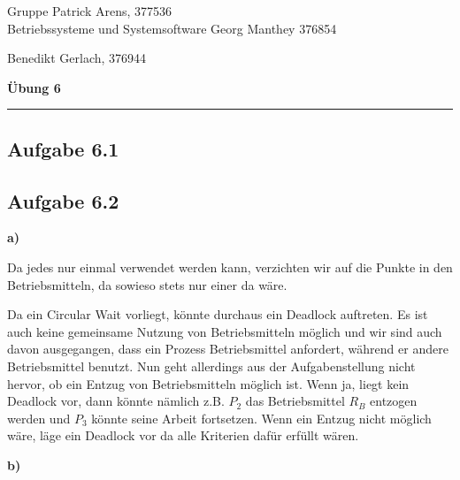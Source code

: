 \documentclass[a4paper,graphics,11pt]{article}
\newcommand{\aufgabe}[1]{\subsection*{Aufgabe #1}}
\begin{document}
\noindent Gruppe              \hfill Patrick Arens, 377536\\
\noindent Betriebssysteme und Systemsoftware    \hfill Georg Manthey 376854\\
\strut\hfill Benedikt Gerlach, 376944\\
\begin{center}
	\LARGE{\textbf{Übung 6}}
\end{center}
\begin{center}
\rule[0.1ex]{\textwidth}{1pt}
\end{center}

\aufgabe{6.1}

\aufgabe{6.2}

\textbf{a)}

Da jedes nur einmal verwendet werden kann, verzichten wir auf die Punkte in den Betriebsmitteln, da sowieso stets nur einer da wäre.


Da ein Circular Wait vorliegt, könnte durchaus ein Deadlock auftreten. Es ist auch keine gemeinsame Nutzung von Betriebsmitteln möglich und wir sind auch davon ausgegangen, dass ein Prozess Betriebsmittel anfordert, während er andere Betriebsmittel benutzt. Nun geht allerdings aus der Aufgabenstellung nicht hervor, ob ein Entzug von Betriebsmitteln möglich ist. Wenn ja, liegt kein Deadlock vor, dann könnte nämlich z.B. $P_2$ das Betriebsmittel $R_B$ entzogen werden und $P_3$ könnte seine Arbeit fortsetzen. Wenn ein Entzug nicht möglich wäre, läge ein Deadlock vor da alle Kriterien dafür erfüllt wären.

\textbf{b)}
\end{document}
